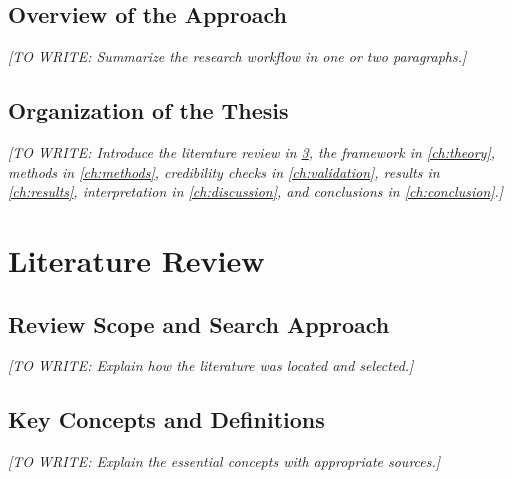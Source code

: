 \documentclass[12pt,a4paper,oneside]{report}
\newif\ifshowguidance
\newcommand{\Guide}[1]{%
  \ifshowguidance
  \begin{tcolorbox}[enhanced,breakable,colback=GuideBlue,
    colframe=GuideBorder,boxrule=0.5pt,arc=1mm,
    title={Writing guide --- replace with your research},
    colbacktitle=ThesisBlue,coltitle=white,fonttitle=\small\bfseries,
    before skip=10pt,after skip=10pt]
    \small #1
  \end{tcolorbox}
  \fi}
\newcommand{\Draft}[1]{\par\noindent\textit{[TO WRITE: #1]}\par}
\begin{document}
\section{Overview of the Approach}
\Guide{Give a short, high-level explanation of the study design and evidence.
Save implementation details and full equations for later chapters.}
\Draft{Summarize the research workflow in one or two paragraphs.}

\section{Organization of the Thesis}
\Guide{Describe the purpose of each retained chapter in one sentence.
Update this paragraph after changing the structure. Cross-references below
illustrate automatic numbering.}
\Draft{Introduce the literature review in \cref{ch:literature}, the framework
in \cref{ch:theory}, methods in \cref{ch:methods}, credibility checks in
\cref{ch:validation}, results in \cref{ch:results}, interpretation in
\cref{ch:discussion}, and conclusions in \cref{ch:conclusion}.}

\chapter{Literature Review}
\label{ch:literature}
\Guide{Build an argument for the study rather than listing paper summaries.
Organize by concepts, competing explanations, methods, or findings. Compare
what studies establish, their evidence, and their limitations. A narrative
review is not a systematic review unless systematic procedures were used.}

\section{Review Scope and Search Approach}
\Guide{State the themes, disciplines, period, databases, key search terms,
and inclusion/exclusion logic in proportion to the review's purpose. For a
systematic review, document the protocol, screening, eligibility, search
dates, appraisal, and synthesis procedures in sufficient detail. For a
narrative review, describe the selection approach honestly without implying
exhaustiveness. Include foundational and relevant recent work.}
\Draft{Explain how the literature was located and selected.}

\section{Key Concepts and Definitions}
\Guide{Define concepts and constructs consistently. Compare definitions
where disagreement affects your research. Identify the definition adopted
in this thesis and why it is appropriate.}
\Draft{Explain the essential concepts with appropriate sources.}
\end{document}
